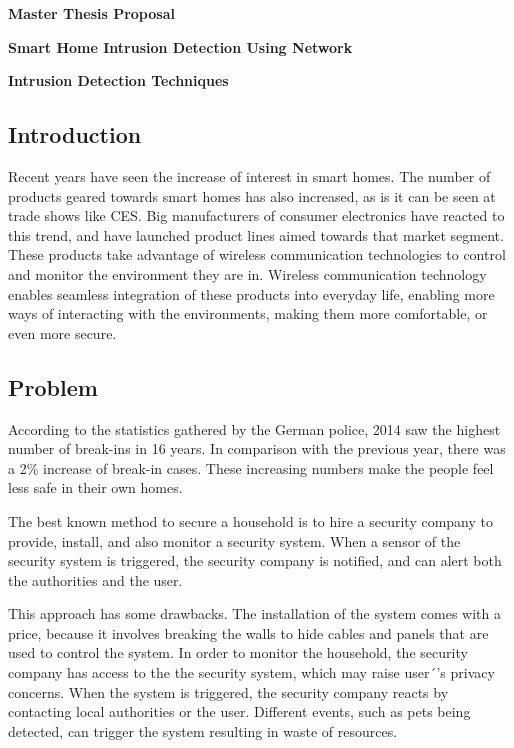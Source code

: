 \documentclass[12pt]{article}
\begin{document}
\thispagestyle{empty}

\bigskip
\bigskip

\centerline{\textbf{\Large{Master Thesis Proposal}}}

\bigskip

\textbf{\Large{Smart Home Intrusion Detection Using Network}}

\centerline{\textbf{\Large{ Intrusion Detection Techniques}}}

\bigskip



\subsection*{Introduction}
Recent years have seen the increase of interest in smart homes\cite{googletrends}. The number of products geared towards smart homes has also increased, as is it can be seen at trade shows like CES\cite{cnet}. Big manufacturers of consumer electronics have reacted to this trend, and have launched product lines aimed towards that market segment. These products take advantage of wireless communication technologies to control and monitor the environment they are in. Wireless communication technology enables seamless integration of these products into everyday life, enabling more ways of interacting with the environments, making them more comfortable, or even more secure.

\subsection*{Problem}
According to the statistics gathered by the German police, 2014 saw the highest number of break-ins in 16 years. In comparison with the previous year, there was a 2\% increase of break-in cases\cite{breakins}. These increasing numbers make the people feel less safe in their own homes.

The best known method to secure a household is to hire a security company to provide, install, and also monitor a security system. When a sensor of the security system is triggered, the security company is notified, and can alert both the authorities and the user.
 
This approach has some drawbacks. The installation of the system comes with a price, because it  involves breaking the walls to hide cables and panels that are used to control the system. In order to monitor the household, the security company has access to the the security system, which may raise user´'s privacy concerns. When the system is triggered, the security company reacts by contacting local authorities or the user. Different events, such as pets being detected, can trigger the system resulting in waste of resources.
\end{document}
